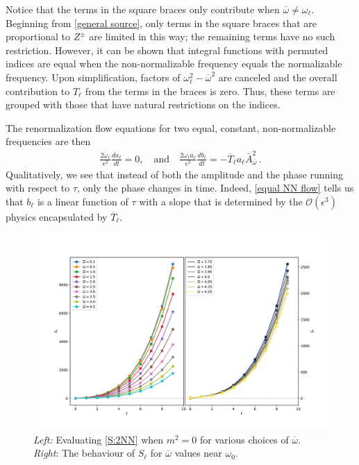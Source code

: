 \documentclass[letterpaper,11pt]{article}
\newcommand{\ol}{\omega_\ell}
\newcommand{\mc}{\mathcal}
\newcommand{\ob}{\overline{\omega}}
\begin{document}
Notice that the terms in the square braces only contribute when $\ob \neq \ol$. Beginning from \eqref{general source}, only terms in the square braces that are proportional to $Z^{\pm}$ are limited in this way; the remaining terms have no such restriction. However, it can be shown that integral functions with permuted indices are equal when the non-normalizable frequency equals the normalizable frequency. Upon simplification, factors of $\ol^2 - \ob^2$ are canceled and the overall contribution to $T_{\ell}$ from the terms in the braces is zero. Thus, these terms are grouped with those that have natural restrictions on the indices. 

The renormalization flow equations for two equal, constant, non-normalizable frequencies are then
\begin{align}
\label{equal NN flow}
\frac{2 \ol}{\epsilon^2} \frac{d a_\ell}{dt} =  0 , \quad \text{and} \quad \frac{2 \ol a_\ell}{\epsilon^2} \frac{d b_\ell}{d t} = - \overline{T}_\ell a_\ell \bar A^2_{\ob} \, .
\end{align}
Qualitatively, we see that instead of both the amplitude and the phase running with respect to $\tau$, only the phase changes in time. Indeed, \eqref{equal NN flow} tells us that $b_\ell$ is a linear function of $\tau$ with a slope that is determined by the $\mc O(\epsilon^3)$ physics encapsulated by $\overline{T}_\ell$.

\begin{figure}
\centering
\includegraphics[width=\textwidth]{./figures/NN_equalfreq_sourceterms_m0_0+zoom}
\caption{{\it Left:} Evaluating \eqref{S:2NN} when $m^2 = 0$ for various choices of $\ob$. {\it Right}: The behaviour of $S_\ell$ for $\ob$ values near $\omega_0$.}
\label{fig:equal_frequency_m0}
\end{figure}
\end{document}
